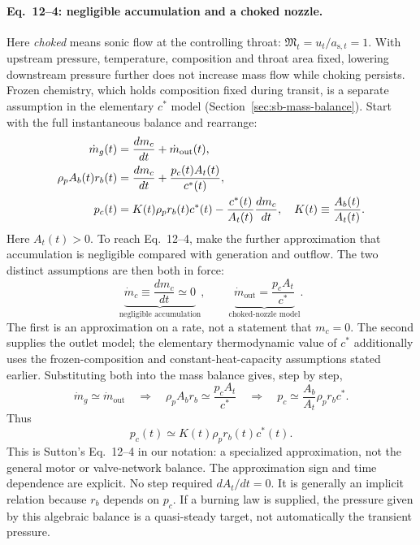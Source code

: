 \paragraph{Eq.~12--4: negligible accumulation and a choked nozzle.}
Here \emph{choked} means sonic flow at the controlling throat:
$\mathfrak M_t=u_t/a_{\mathrm{s},t}=1$. With upstream pressure, temperature,
composition and throat area fixed, lowering downstream pressure further
does not increase mass flow while choking persists. Frozen chemistry,
which holds composition fixed during transit, is a separate assumption
in the elementary $c^*$ model (Section~\ref{sec:sb-mass-balance}).
Start with the full instantaneous balance and rearrange:
\begin{align}
 \dot m_g(t)
 &=\frac{dm_c}{dt}+\dot m_{\mathrm{out}}(t),\notag\\
 \rho_p A_b(t)r_b(t)
 &=\frac{dm_c}{dt}+\frac{p_c(t)A_t(t)}{c^*(t)},\notag\\
 p_c(t)
 &=K(t)\rho_p r_b(t)c^*(t)
   -\frac{c^*(t)}{A_t(t)}\frac{dm_c}{dt},
 \quad K(t)\equiv\frac{A_b(t)}{A_t(t)}.
 \label{eq:sb-pressure-with-storage}
\end{align}
Here $A_t(t)>0$. To reach Eq.~12--4, make the further approximation
that accumulation is negligible compared with generation and outflow.
The two distinct assumptions are then both in force:
\[
 \underbrace{\dot m_c\equiv\frac{dm_c}{dt}\simeq0}_{
                    \text{negligible accumulation}},
 \qquad
 \underbrace{\dot m_{\mathrm{out}}=\frac{p_cA_t}{c^*}}_{
                    \text{choked-nozzle model}}.
\]
The first is an approximation on a rate, not a statement that
$m_c=0$. The second supplies the outlet model; the elementary
thermodynamic value of $c^*$ additionally uses the frozen-composition
and constant-heat-capacity assumptions stated earlier.
Substituting both into the mass balance gives, step by step,
\[
 \dot m_g\simeq\dot m_{\mathrm{out}}
 \quad\Longrightarrow\quad
 \rho_pA_b r_b\simeq\frac{p_cA_t}{c^*}
 \quad\Longrightarrow\quad
 p_c\simeq\frac{A_b}{A_t}\rho_p r_bc^*.
\]
Thus
\begin{equation}\label{eq:sb-sutton-quasisteady}
 \boxed{p_c(t)\simeq K(t)\rho_p r_b(t)c^*(t).}
\end{equation}
This is Sutton's Eq.~12--4 in our notation: a specialized approximation,
not the general motor or valve-network balance. The approximation sign
and time dependence are explicit. No step required $dA_t/dt=0$.
It is generally an implicit relation because $r_b$ depends on $p_c$.
If a burning law is supplied, the pressure given by this algebraic
balance is a quasi-steady target, not automatically the transient
pressure.

